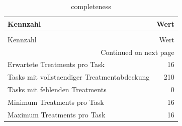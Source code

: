 \begin{longtable}{lr}
\caption{completeness} \label{tab:completeness} \\
\toprule
Kennzahl & Wert \\
\midrule
\endfirsthead
\caption[]{completeness} \\
\toprule
Kennzahl & Wert \\
\midrule
\endhead
\midrule
\multicolumn{2}{r}{Continued on next page} \\
\midrule
\endfoot
\bottomrule
\endlastfoot
Erwartete Treatments pro Task & 16 \\
Tasks mit vollstaendiger Treatmentabdeckung & 210 \\
Tasks mit fehlenden Treatments & 0 \\
Minimum Treatments pro Task & 16 \\
Maximum Treatments pro Task & 16 \\
\end{longtable}
